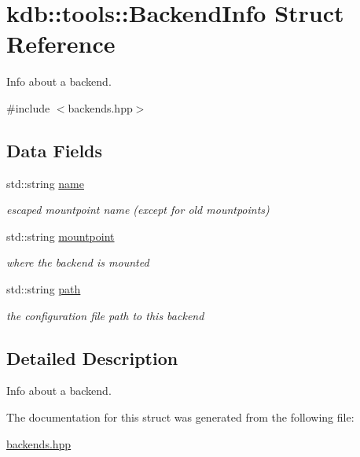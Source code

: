 \hypertarget{structkdb_1_1tools_1_1BackendInfo}{\section{kdb\-:\-:tools\-:\-:Backend\-Info Struct Reference}
\label{structkdb_1_1tools_1_1BackendInfo}
}


Info about a backend.  




{\ttfamily \#include $<$backends.\-hpp$>$}

\subsection*{Data Fields}
\begin{DoxyCompactItemize}
\item 
\hypertarget{structkdb_1_1tools_1_1BackendInfo_a7da85fc3a4bbb7412b0544aceeb9da75}{std\-::string \hyperlink{structkdb_1_1tools_1_1BackendInfo_a7da85fc3a4bbb7412b0544aceeb9da75}{name}}\label{structkdb_1_1tools_1_1BackendInfo_a7da85fc3a4bbb7412b0544aceeb9da75}

\begin{DoxyCompactList}\small\item\em escaped mountpoint name (except for old mountpoints) \end{DoxyCompactList}\item 
\hypertarget{structkdb_1_1tools_1_1BackendInfo_a043c4414dc2b41bab37efb3c878f6cb8}{std\-::string \hyperlink{structkdb_1_1tools_1_1BackendInfo_a043c4414dc2b41bab37efb3c878f6cb8}{mountpoint}}\label{structkdb_1_1tools_1_1BackendInfo_a043c4414dc2b41bab37efb3c878f6cb8}

\begin{DoxyCompactList}\small\item\em where the backend is mounted \end{DoxyCompactList}\item 
\hypertarget{structkdb_1_1tools_1_1BackendInfo_ac1d9984e01a78dba8e01dca0b91cbf30}{std\-::string \hyperlink{structkdb_1_1tools_1_1BackendInfo_ac1d9984e01a78dba8e01dca0b91cbf30}{path}}\label{structkdb_1_1tools_1_1BackendInfo_ac1d9984e01a78dba8e01dca0b91cbf30}

\begin{DoxyCompactList}\small\item\em the configuration file path to this backend \end{DoxyCompactList}\end{DoxyCompactItemize}


\subsection{Detailed Description}
Info about a backend. 

The documentation for this struct was generated from the following file\-:\begin{DoxyCompactItemize}
\item 
\hyperlink{backends_8hpp}{backends.\-hpp}\end{DoxyCompactItemize}
